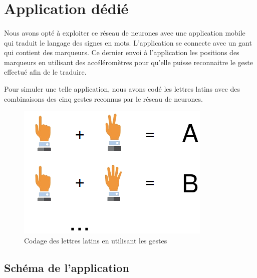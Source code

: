 \section{Application dédié}
\paragraph{}
Nous avons opté à exploiter ce réseau de neurones avec une application mobile qui traduit le langage des signes en mots. L’application se connecte avec un gant qui contient des marqueurs. Ce dernier envoi à l’application les positions des marqueurs en utilisant des accéléromètres pour qu’elle puisse reconnaitre le geste effectué afin de le traduire.

Pour simuler une telle application, nous avons codé les lettres latins avec des combinaisons des cinq gestes reconnus par le réseau de neurones.\\
\begin{center}
	\begin{figure}[H]
		\centering
		\includegraphics[scale=0.4]{images/coding.png}
		\caption{\small Codage des lettres latins en utilisant les gestes}
	\end{figure}
\end{center}
\subsection{Schéma de l’application}
